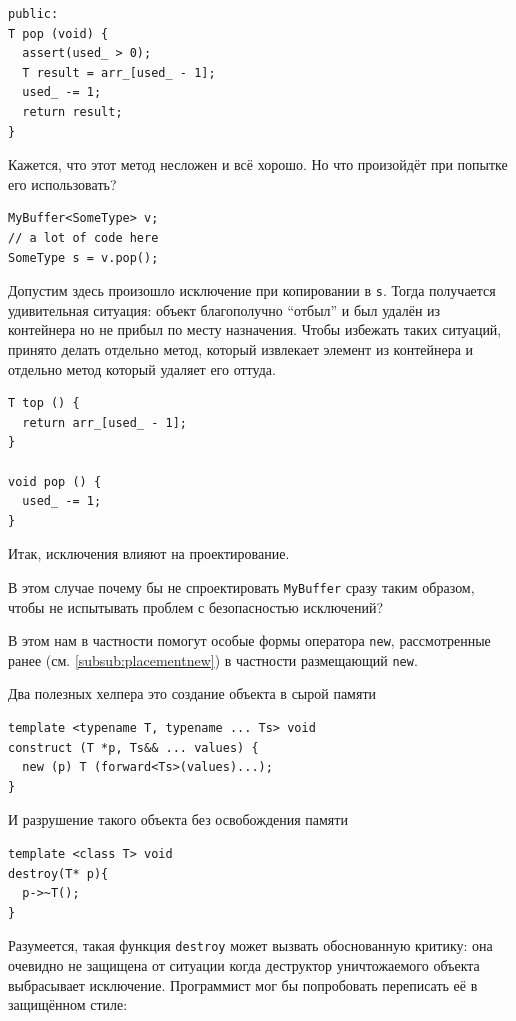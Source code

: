 \documentclass[a4paper,12pt,oneside]{article}
\begin{document}
\begin{lstlisting}
public: 
T pop (void) {
  assert(used_ > 0);
  T result = arr_[used_ - 1];
  used_ -= 1;
  return result;
}
\end{lstlisting}

Кажется, что этот метод несложен и всё хорошо. Но что произойдёт при попытке его использовать?

\begin{lstlisting}
MyBuffer<SomeType> v;
// a lot of code here
SomeType s = v.pop();
\end{lstlisting}

Допустим здесь произошло исключение при копировании в \lstinline!s!. Тогда получается удивительная ситуация: объект благополучно ``отбыл'' и был удалён из контейнера но не прибыл по месту назначения. Чтобы избежать таких ситуаций, принято делать отдельно метод, который извлекает элемент из контейнера и отдельно метод который удаляет его оттуда.

\begin{lstlisting}
T top () {
  return arr_[used_ - 1];
}

void pop () {
  used_ -= 1;
}
\end{lstlisting}

Итак, исключения влияют на проектирование.

В этом случае почему бы не спроектировать \lstinline!MyBuffer! сразу таким образом, чтобы не испытывать проблем с безопасностью исключений?

В этом нам в частности помогут особые формы оператора \lstinline!new!, рассмотренные ранее (см. \ref{subsub:placementnew}) в частности размещающий \lstinline!new!.

Два полезных хелпера это создание объекта в сырой памяти

\begin{lstlisting}
template <typename T, typename ... Ts> void
construct (T *p, Ts&& ... values) {
  new (p) T (forward<Ts>(values)...);
}
\end{lstlisting}

И разрушение такого объекта без освобождения памяти

\begin{lstlisting}
template <class T> void
destroy(T* p){
  p->~T();
}
\end{lstlisting}

Разумеется, такая функция \lstinline!destroy! может вызвать обоснованную критику: она очевидно не защищена от ситуации когда деструктор уничтожаемого объекта выбрасывает исключение. Программист мог бы попробовать переписать её в защищённом стиле:
\end{document}

